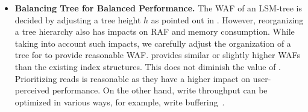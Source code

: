 \begin{itemize}[leftmargin=*]
\begin{comment}
The approximate indexing of \ours{} inevitably results in trial errors which
cause extra reads while servicing user I/Os. The key technical issue is thus
how to accurately estimate a physical location of an input query.
Motivated by the fact that BFs and PLR models enable us to set a specific error
rate, trading accuracy against memory usage, we carefully design BFs and PLRs
to guarantee a target error rate with minimal DRAM usage. Taking an example of
one specific design point, \ours{} ensures the error rate of 0.1 (\ie~one error
out of 10 queries) while consuming 3.43$\times$ less DRAM than typical FTL
designs.
\end{comment}

\item \textbf{Balancing Tree for Balanced Performance.}
The WAF of an LSM-tree is decided 
by adjusting a tree height $h$ as pointed out in .
However, reorganizing a tree hierarchy also has impacts on RAF and memory consumption.
While taking into account such impacts,
we carefully adjust the organization of a tree
for \ours{} to provide reasonable WAF.
\ours{} provides similar or slightly higher WAFs
than the existing index structures. This does not
diminish the value of \ours{}. Prioritizing reads is reasonable
as they have a higher impact on user-perceived
performance. On the other hand, write throughput can be optimized in various
ways, for example, write buffering~\cite{write-buffer}.
\end{itemize}

\begin{comment}
\ours{} adjusts the organization of a tree to provide reasonable WAF.
Moreover, by combining SSD's cleaning and compaction and by optimizing compaction process
to minimize amount of data to migrate, \ours{} further reduces 
WAF. Depending on workloads, \ours{} provides similar or slightly higher WAFs
than the existing index structures. This does not
diminish the value of \ours{}. Optimizing reads first is reasonable
because they have a higher impact on user-perceived
performance. Write throughput can also be optimized in various
ways via write buffering~\cite{write-buffer}, 
write suspension/resume~\cite{suspension}, and
so on.
\end{comment}


